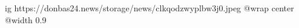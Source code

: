  
 
 
 
 

\ifcmt
  ig https://donbas24.news/storage/news/clkqodzwyplbw3j0.jpeg
  @wrap center
  @width 0.9
\fi
